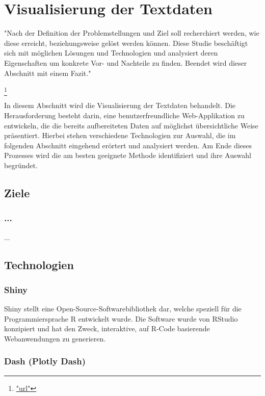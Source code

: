 \section{Visualisierung der Textdaten}\label{sec:visualisierung}

"Nach der Definition der Problemstellungen und Ziel soll recherchiert werden, wie diese erreicht, beziehungsweise gelöst werden können. Diese Studie beschäftigt sich mit möglichen Lösungen und Technologien und analysiert deren Eigenschaften um konkrete Vor- und Nachteile zu finden. Beendet wird dieser Abschnitt mit einem Fazit."

\footnote{\url{"url"}} 

\smallskip\par\noindent

In diesem Abschnitt wird die Visualisierung der Textdaten behandelt. Die Herausforderung besteht darin, eine benutzerfreundliche Web-Applikation zu entwickeln, die die bereits aufbereiteten Daten auf möglichst übersichtliche Weise präsentiert. Hierbei stehen verschiedene Technologien zur Auswahl, die im folgenden Abschnitt eingehend erörtert und analysiert werden. Am Ende dieses Prozesses wird die am besten geeignete Methode identifiziert und ihre Auswahl begründet.

\subsection{Ziele}

\subsubsection{...}

...

\subsection{Technologien}

\subsubsection{Shiny}

Shiny stellt eine Open-Source-Softwarebibliothek dar, welche speziell für die Programmiersprache R entwickelt wurde. Die Software wurde von RStudio konzipiert und hat den Zweck, interaktive, auf R-Code basierende Webanwendungen zu generieren.

\subsubsection{Dash (Plotly Dash)}

